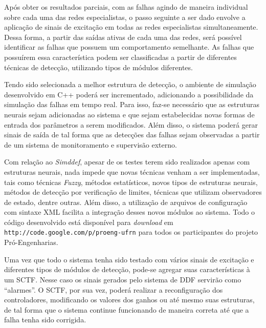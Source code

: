 Após obter os resultados parciais, com as falhas agindo de maneira individual
sobre cada uma das redes especialistas, o passo seguinte a ser dado envolve a
aplicação de sinais de excitação em todas as redes especialistas
simultaneamente. Dessa forma, a partir das saídas ativas de cada uma das redes,
será possível identificar as falhas que possuem um comportamento semelhante.
As falhas que possuírem essa característica podem ser classificadas a partir de
diferentes técnicas de detecção, utilizando tipos de módulos diferentes.

Tendo sido selecionada a melhor estrutura de detecção, o ambiente de simulação
desenvolvido em C++ poderá ser incrementado, adicionando a possibilidade da
simulação das falhas em tempo real. Para isso, faz-se necessário que as
estruturas neurais sejam adicionadas ao sistema e que sejam estabelecidas novas
formas de entrada dos parâmetros a serem modificados. Além disso, o sistema
poderá gerar sinais de saída de tal forma que as detecções das falhas sejam
observadas a partir de um sistema de monitoramento e supervisão externo. 

Com relação ao {\it Simddef}, apesar de os testes terem sido realizados apenas
com estruturas neurais, nada impede que novas técnicas venham a ser
implementadas, tais como técnicas {\it Fuzzy}, métodos estatísticos, novos tipos
de estruturas neurais, métodos de detecção por verificação de limites, técnicas
que utilizam observadores de estado, dentre outras. Além disso, a utilização de
arquivos de configuração com sintaxe XML facilita a integração desses novos
módulos ao sistema. Todo o código desenvolvido está disponível para {\it
download} em {\tt http://code.google.com/p/proeng-ufrn} para todos os
participantes do projeto Pró-Engenharias.

Uma vez que todo o sistema tenha sido testado com vários sinais de excitação e
diferentes tipos de módulos de detecção, pode-se agregar suas características à
um SCTF. Nesse caso os sinais gerados pelo sistema de DDF servirão como
``alarmes''. O SCTF, por sua vez, poderá realizar a reconfiguração dos
controladores, modificando os valores dos ganhos ou até mesmo suas estruturas,
de tal forma que o sistema continue funcionando de maneira correta até que a
falha tenha sido corrigida.
